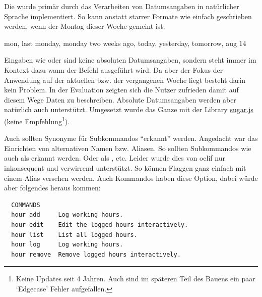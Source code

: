 \documentclass[oneside,bibliography=totocnumbered,BCOR=5mm]{scrbook}
\newenvironment{code}{\captionsetup{type=listing, skip=0pt}}{}
\begin{document}

Die  wurde primär durch das Verarbeiten von
Datumsangaben in natürlicher Sprache implementiert. So kann anstatt starrer
Formate wie  einfach  geschrieben
werden, wenn der Montag dieser Woche gemeint ist.

\begin{code}
  \begin{shellcode}
  mon, last monday, monday two weeks ago, today, yesterday, tomorrow, aug 14
  \end{shellcode}
  \medskip
\end{code}

Eingaben wie  oder  sind keine
absoluten Datumsangaben, sondern steht immer im Kontext dazu wann der Befehl
ausgeführt wird. Da aber der Fokus der Anwendung auf der aktuellen bzw. der
vergangenen Woche liegt besteht darin kein Problem. In der Evaluation zeigten
sich die Nutzer zufrieden damit auf diesem Wege Daten zu beschreiben. Absolute
Datumsangaben werden aber natürlich auch unterstützt. Umgesetzt wurde das
Ganze mit der Library \href{https://sugarjs.com/dates/}{sugar.js} (keine
Empfehlung\footnote{Keine Updates seit 4 Jahren. Auch sind im späteren Teil des
Bauens ein paar `Edgecase' Fehler aufgefallen.}).

\bigskip

Auch sollten Synonyme für Subkommandos ``erkannt'' werden. Angedacht war das
Einrichten von alternativen Namen bzw. Aliasen. So sollten Subkommandos
wie  auch als  erkannt werden. Oder
 als , etc. Leider wurde dies von oclif
nur inkonsequent und verwirrend unterstützt. So können Flaggen ganz einfach mit
einem Alias versehen werden. Auch Kommandos haben diese Option, dabei würde aber
folgendes heraus kommen:

\begin{code}
  \begin{verbatim}
  COMMANDS
  hour add     Log working hours.
  hour edit    Edit the logged hours interactively.
  hour list    List all logged hours.
  hour log     Log working hours.
  hour remove  Remove logged hours interactively.
  \end{verbatim}
  \medskip
\end{code}
\end{document}
